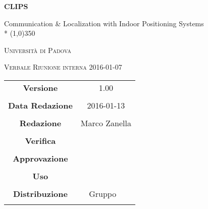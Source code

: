 \documentclass[a4paper,12pt]{article}
\author{Marco Zanella}
\date{05/01/2016}
\begin{document}
\begin{titlepage}
	\centering
	{\huge\bfseries CLIPS\par}
	Communication \& Localization with Indoor Positioning Systems \\*
	\line(1,0){350} \\
	{\scshape\LARGE Università di Padova \par}
	\vspace{1cm}
	{\scshape\Large Verbale Riunione interna 2016-01-07\par}
	\vspace{1.5cm}
	\logo
	\vspace{2cm}	
	\vfill \vfill
	\begin{tabular}{c|c}
		{\hfill \textbf{Versione}} 			& 1.00				\\ \\
		{\hfill\textbf{Data Redazione}} 		& 2016-01-13  		\\ \\
		{\hfill\textbf{Redazione}} 			& Marco Zanella		\\ \\
		{\hfill\textbf{Verifica}} 				&  					\\ \\
		{\hfill\textbf{Approvazione}} 		&  					\\ \\
		{\hfill\textbf{Uso}} 					& 					\\ \\
		{\hfill\textbf{Distribuzione}} 			& Gruppo \leaf\		\\ \\
	\end{tabular}
\end{titlepage}
	
	\newpage

	
	\label{LastFrontPage}
	

	\newpage
	
	\pagestyle{mymain}
	
	
		

	
		
	
	
		
	
	
		
				
	\label{LastPage}
\end{document}
